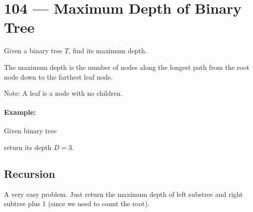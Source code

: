 \section{104 --- Maximum Depth of Binary Tree}
Given a binary tree $T$, find its maximum depth.
\par
The maximum depth is the number of nodes along the longest path from the root node down to the farthest leaf node.
\par
Note: A leaf is a node with no children.
\paragraph{Example:}
Given binary tree
\begin{figure}[H]
\end{figure}
return its depth $D = 3$.
\subsection{Recursion}
A very easy problem. Just return the maximum depth of left substree and right subtree plus 1 (since we need to count the root).
